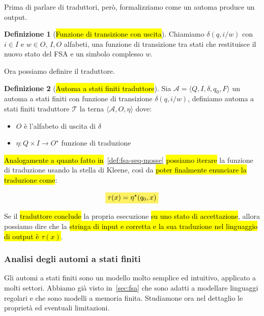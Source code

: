 \documentclass[a4paper,11pt,oneside]{article}
\theoremstyle{plain}
\theoremstyle{definition}
\newtheorem{defn}{Definizione}[section]
\theoremstyle{remark}
\newcommand{\mhl}[1]{\colorbox{hlcolor}{$\displaystyle #1$}}
\begin{document}
Prima di parlare di traduttori, però, formalizziamo come un automa produce un
output.

\begin{defn}[\hl{Funzione di transizione con uscita}]\label{def:fsa-transizione-uscita}
  Chiamiamo $\delta(q, i/w)$ con $i \in I$ e $w \in O$, $I, O$ alfabeti, una
  funzione di transizione tra stati che restituisce il nuovo stato del FSA e
  un simbolo complesso $w$.
\end{defn}

Ora possiamo definire il traduttore.

\begin{defn}[\hl{Automa a stati finiti traduttore}]\label{def:fsa-trad}
  Sia $\mathcal{A} = \langle Q, I, \delta, q_0, F \rangle $ un automa a stati
  finiti con funzione di transizione $\delta(q, i/w)$, definiamo automa a
  stati finiti traduttore $\mathcal{T}$ la terna
  $\langle \mathcal{A}, O, \eta \rangle$ dove:

  \begin{itemize}
    \item $O$ è l'alfabeto di uscita di $\delta$
    \item $\eta : Q \times I \to O^\star$ funzione di traduzione
  \end{itemize}
\end{defn}

\hl{Analogamente a quanto fatto in}~\ref{def:fsa-seq-mosse} \hl{possiamo
iterare} la funzione di traduzione usando la stella di Kleene, così da \hl{poter
finalmente enunciare la traduzione come}:

\begin{equation}
  \mhl{\tau(x) = \eta^\star(q_0, x)}
\end{equation}

Se il \hl{traduttore conclude} la propria esecuzione \hl{su uno stato di
accettazione}, allora possiamo dire che la \hl{stringa di input e corretta e la
sua traduzione nel linguaggio di output è $\tau(x)$}.

\subsubsection{Analisi degli automi a stati finiti}\label{sec:fsa-analisi}

Gli automi a stati finiti sono un modello molto semplice ed intuitivo, applicato
a molti settori. Abbiamo già visto in~\ref{sec:fsa} che sono adatti a modellare
linguaggi regolari e che sono modelli a memoria finita. Studiamone ora nel
dettaglio le proprietà ed eventuali limitazioni.
\end{document}
